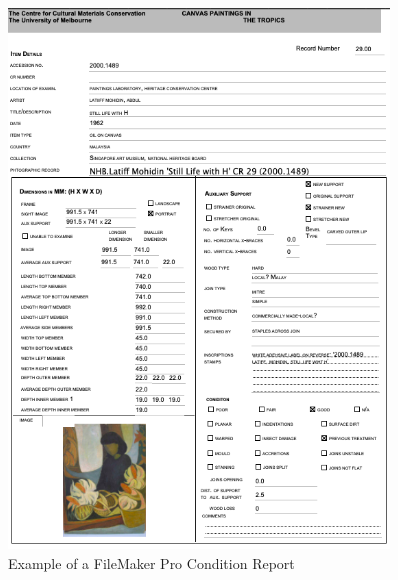\documentclass[11pt, oneside]{article}
\begin{document}
\begin{figure}[H]
    \centering
    \captionsetup{justification=centering}
    \begin{minipage}{0.5\textwidth}
        \centering
        \includegraphics[width=0.9\textwidth]{images/ReportExample.png} %
        \caption{Example of a FileMaker Pro Condition Report}
        \label{fig:conditionReportEx}
    \end{minipage}\hfill
    \begin{minipage}{0.5\textwidth}
        \centering

\end{minipage}
\end{figure}
\end{document}

